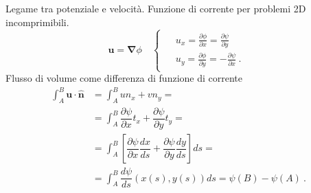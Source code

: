 \sol

\partone
  Legame tra potenziale e velocità. Funzione di corrente per problemi 2D incomprimibili.
\begin{equation}
  \bm{u} = \bm{\nabla} \phi \quad
  \begin{cases}
  \begin{aligned}
   & u_x  =  \frac{\partial \phi}{\partial x}  = \frac{\partial \psi}{\partial y} \\
   & u_y  =  \frac{\partial \phi}{\partial y}  = - \frac{\partial \psi}{\partial x} \ .
  \end{aligned}
  \end{cases}
 \end{equation}
 Flusso di volume come differenza di funzione di corrente
 \begin{equation}
 \begin{aligned}
  \int_{A}^B \bm{u} \cdot {\bm{\hat{n}}} & =
  \int_{A}^B u n_x + v n_y = \\
 & = \int_A^B \dfrac{\partial \psi}{\partial x} t_x +
              \dfrac{\partial \psi}{\partial y} t_y = \\
 & = \int_A^B \left[ \dfrac{\partial \psi}{\partial x} \dfrac{dx}{ds} +
              \dfrac{\partial \psi}{\partial y} \dfrac{dy}{ds} \right] ds = \\
 & = \int_{A}^B \dfrac{d \psi}{ds} (x(s),y(s)) ds = \psi(B) - \psi(A) \ .
 \end{aligned}
\end{equation}

\parttwo

